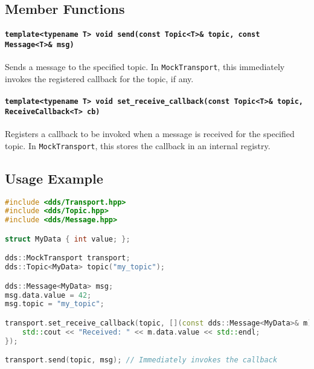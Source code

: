 \documentclass[12pt]{report}
\begin{document}
\subsection{Member Functions}
\paragraph{\texttt{template<typename T> void send(const Topic<T>\& topic, const Message<T>\& msg)}}
Sends a message to the specified topic. In \texttt{MockTransport}, this immediately invokes the registered callback for the topic, if any.

\paragraph{\texttt{template<typename T> void set\_receive\_callback(const Topic<T>\& topic, ReceiveCallback<T> cb)}}
Registers a callback to be invoked when a message is received for the specified topic. In \texttt{MockTransport}, this stores the callback in an internal registry.

\subsection{Usage Example}
\begin{lstlisting}[language=C++]
#include <dds/Transport.hpp>
#include <dds/Topic.hpp>
#include <dds/Message.hpp>

struct MyData { int value; };

dds::MockTransport transport;
dds::Topic<MyData> topic("my_topic");

dds::Message<MyData> msg;
msg.data.value = 42;
msg.topic = "my_topic";

transport.set_receive_callback(topic, [](const dds::Message<MyData>& m) {
    std::cout << "Received: " << m.data.value << std::endl;
});

transport.send(topic, msg); // Immediately invokes the callback
\end{lstlisting}
\end{document}

